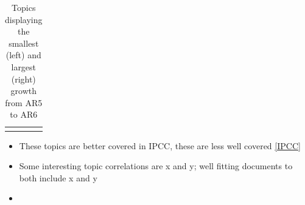 \documentclass{article}
\begin{document}
{\begin{table}
	\begin{center}
	\begin{tabular}{cc}
	 & 
	\end{tabular}
	\caption{Topics displaying the smallest (left) and largest (right) growth from AR5 to AR6}
	\end{center}
	\label{AR6}
\end{table}

%

\begin{itemize}
    \item These topics are better covered in IPCC, these are less well covered \ref{IPCC}
    \item Some interesting topic correlations are x and y; well fitting documents to both include x and y
    \item
\end{itemize}


}
\end{document}
